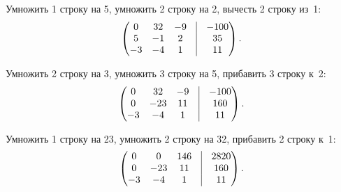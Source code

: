 \documentclass[10pt, a4paper, titlepage]{article}
\begin{document}
Умножить 1 строку на 5, умножить 2 строку на 2, вычесть 2 строку из~1:
\begin{equation*}
    \begin{pmatrix}
        0 & 32 & -9 & \vrule & -100 \\
        5 & -1 & 2 & \vrule & 35 \\
        -3 & -4 & 1 & \vrule & 11
    \end{pmatrix}.
\end{equation*}

Умножить 2 строку на 3, умножить 3 строку на 5, прибавить 3 строку к~2:
\begin{equation*}
    \begin{pmatrix}
        0 & 32 & -9 & \vrule & -100 \\
        0 & -23 & 11 & \vrule & 160 \\
        -3 & -4 & 1 & \vrule & 11
    \end{pmatrix}.
\end{equation*}

Умножить 1 строку на 23, умножить 2 строку на 32, прибавить 2 строку к~1:
\begin{equation*}
    \begin{pmatrix}
        0 & 0 & 146 & \vrule & 2820 \\
        0 & -23 & 11 & \vrule & 160 \\
        -3 & -4 & 1 & \vrule & 11
    \end{pmatrix}.
\end{equation*}

\end{document}
